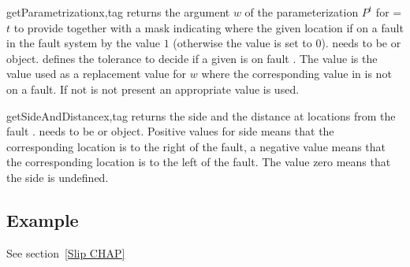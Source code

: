 \begin{methoddesc}[FaultSystem]{getParametrization}{x,tag }
returns the argument $w$ of the parameterization $P^t$ for =$t$ to provide 
together with a mask indicating where the given location if on a fault in the fault system by the value $1$ (otherwise the value is set to $0$).  needs to be \Vector or \numpyNDA object.  defines the tolerance to decide if a given \DataSamplePoints is on fault . The value
 is the value used as a replacement value for $w$ where the corresponding value in  is not 
on a fault. If not  is not present an appropriate value is used.
\end{methoddesc}

\begin{methoddesc}[FaultSystem]{getSideAndDistance}{x,tag}
returns the side and the distance at locations  from the fault .
 needs to be \Vector or \numpyNDA object. Positive values for side means that the corresponding location is 
to the right of the fault, a negative value means that the corresponding location is 
to the left of the fault. The value zero means that the side is undefined.
\end{methoddesc}

\subsection{Example}
See section~\ref{Slip CHAP}







